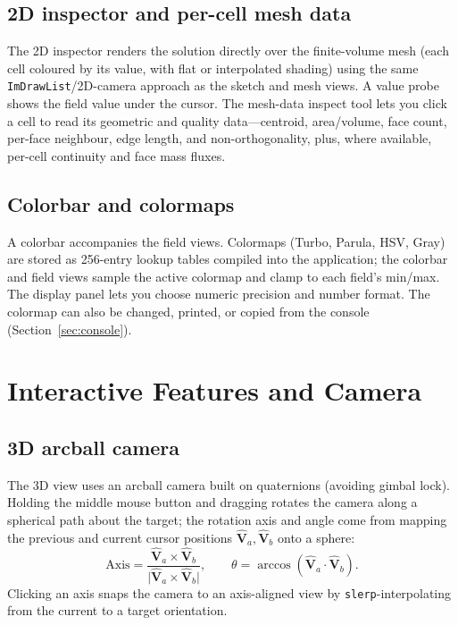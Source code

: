 \documentclass[11pt]{article}
\begin{document}
\subsection{2D inspector and per-cell mesh data}
The 2D inspector renders the solution directly over the finite-volume mesh (each cell
coloured by its value, with flat or interpolated shading) using the same
\texttt{ImDrawList}/2D-camera approach as the sketch and mesh views. A value probe shows
the field value under the cursor. The mesh-data inspect tool lets you click a cell to
read its geometric and quality data---centroid, area/volume, face count, per-face
neighbour, edge length, and non-orthogonality, plus, where available, per-cell
continuity and face mass fluxes.

\subsection{Colorbar and colormaps}
A colorbar accompanies the field views. Colormaps (Turbo, Parula, HSV, Gray) are stored
as 256-entry lookup tables compiled into the application; the colorbar and field views
sample the active colormap and clamp to each field's min/max. The display panel lets
you choose numeric precision and number format. The colormap can also be changed,
printed, or copied from the console (Section~\ref{sec:console}).

\section{Interactive Features and Camera}\label{sec:camera}
\subsection{3D arcball camera}
The 3D view uses an arcball camera built on quaternions (avoiding gimbal lock). Holding
the middle mouse button and dragging rotates the camera along a spherical path about the
target; the rotation axis and angle come from mapping the previous and current cursor
positions $\hat{\mathbf{V}}_a, \hat{\mathbf{V}}_b$ onto a sphere:
\begin{equation}
\text{Axis} = \frac{\hat{\mathbf{V}}_a \times \hat{\mathbf{V}}_b}{\lvert \hat{\mathbf{V}}_a \times \hat{\mathbf{V}}_b\rvert},
\qquad
\theta = \arccos\!\left(\hat{\mathbf{V}}_a \cdot \hat{\mathbf{V}}_b\right).
\end{equation}
Clicking an axis snaps the camera to an axis-aligned view by \texttt{slerp}-interpolating
from the current to a target orientation.
\end{document}
